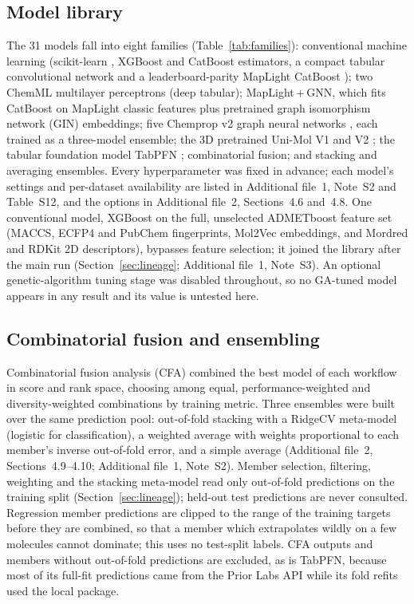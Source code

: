 \subsection{Model library}\label{sec:models}

The 31 models fall into eight families (Table~\ref{tab:families}): conventional machine learning (scikit-learn \cite{pedregosa2011scikit}, XGBoost \cite{chen2016xgboost} and CatBoost \cite{prokhorenkova2018catboost} estimators, a compact tabular convolutional network and a leaderboard-parity MapLight CatBoost \cite{notwell2023admet}); two ChemML multilayer perceptrons (deep tabular); MapLight\,+\,GNN, which fits CatBoost on MapLight classic features plus pretrained graph isomorphism network (GIN) embeddings; five Chemprop v2 graph neural networks \cite{yang2019analyzing,heid2024chemprop,graff2026chempropv2}, each trained as a three-model ensemble; the 3D pretrained Uni-Mol V1 and V2 \cite{zhou2023unimol,ji2024unimol2}; the tabular foundation model TabPFN \cite{hollmann2023tabpfn}; combinatorial fusion; and stacking and averaging ensembles. Every hyperparameter was fixed in advance; each model's settings and per-dataset availability are listed in Additional file~1, Note~S2 and Table~S12, and the options in Additional file~2, Sections~4.6 and~4.8. One conventional model, XGBoost on the full, unselected ADMETboost feature set (MACCS, ECFP4 and PubChem fingerprints, Mol2Vec embeddings, and Mordred and RDKit 2D descriptors), bypasses feature selection; it joined the library after the main run (Section~\ref{sec:lineage}; Additional file~1, Note~S3). An optional genetic-algorithm tuning stage was disabled throughout, so no GA-tuned model appears in any result and its value is untested here.

\subsection{Combinatorial fusion and ensembling}\label{sec:fusion}

Combinatorial fusion analysis (CFA) \cite{hsu2006combinatorial} combined the best model of each workflow in score and rank space, choosing among equal, performance-weighted and diversity-weighted combinations by training metric. Three ensembles were built over the same prediction pool: out-of-fold stacking with a RidgeCV meta-model (logistic for classification), a weighted average with weights proportional to each member's inverse out-of-fold error, and a simple average (Additional file~2, Sections~4.9--4.10; Additional file~1, Note~S2). Member selection, filtering, weighting and the stacking meta-model read only out-of-fold predictions on the training split (Section~\ref{sec:lineage}); held-out test predictions are never consulted. Regression member predictions are clipped to the range of the training targets before they are combined, so that a member which extrapolates wildly on a few molecules cannot dominate; this uses no test-split labels. CFA outputs and members without out-of-fold predictions are excluded, as is TabPFN, because most of its full-fit predictions came from the Prior Labs API while its fold refits used the local package.

